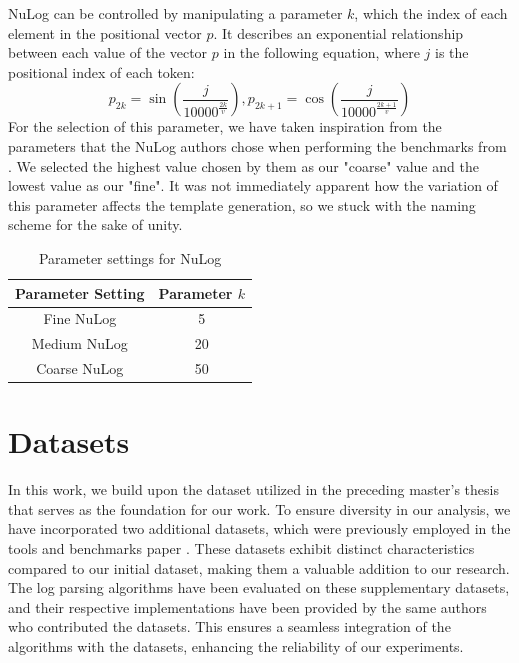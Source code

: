 NuLog can be controlled by manipulating a parameter $k$, which the index of each element in the positional vector $p$. It describes an exponential relationship between each value of the vector $p$ in the following equation, where $j$ is the positional index of each token:
\begin{equation}
p_{2 k}=\sin \left(\frac{j}{10000^{\frac{2 k}{v}}}\right), p_{2 k+1}=\cos \left(\frac{j}{10000^{\frac{2 k+1}{v}}}\right)
\end{equation}
For the selection of this parameter, we have taken inspiration from the parameters that the NuLog authors chose when performing the benchmarks from \cite{zhu2019tools}. We selected the highest value chosen by them as our "coarse" value and the lowest value as our "fine". It was not immediately apparent how the variation of this parameter affects the template generation, so we stuck with the naming scheme for the sake of unity. \\

\begin{table}[h]
\centering
\begin{tabular}{|c|c|}
\hline
\textbf{Parameter Setting} & \textbf{Parameter $k$} \\ \hline
Fine NuLog   & 5  \\ \hline
Medium NuLog & 20 \\ \hline
Coarse NuLog & 50 \\ \hline
\end{tabular}
\caption{Parameter settings for NuLog}
\label{tab:nulog_parameters}
\end{table}


\section{Datasets}
\label{sec:Methods:Datasets}
In this work, we build upon the dataset utilized in the preceding master's thesis that serves as the foundation for our work. To ensure diversity in our analysis, we have incorporated two additional datasets, which were previously employed in the tools and benchmarks paper \cite{zhu2019tools}. These datasets exhibit distinct characteristics compared to our initial dataset, making them a valuable addition to our research.\\

The log parsing algorithms have been evaluated on these supplementary datasets, and their respective implementations have been provided by the same authors who contributed the datasets. This ensures a seamless integration of the algorithms with the datasets, enhancing the reliability of our experiments.\\

